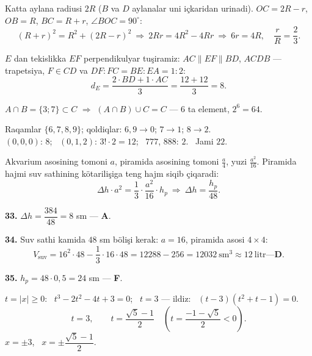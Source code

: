 Katta aylana radiusi $2R$ ($B$ va $D$ aylanalar uni içkaridan urinadi). $OC=2R-r$, $OB=R$, $BC=R+r$, $\angle BOC=90^\circ$:
\[(R+r)^2=R^2+(2R-r)^2\ \Rightarrow\ 2Rr=4R^2-4Rr\ \Rightarrow\ 6r=4R,\quad \frac rR=\frac23.\]

$E$ dan tekislikka $EF$ perpendikulyar tuşiramiz: $AC\parallel EF\parallel BD$, $ACDB$ — trapetsiya, $F\in CD$ va $DF:FC=BE:EA=1:2$:
\[d_E=\frac{2\cdot BD+1\cdot AC}3=\frac{12+12}3=8.\]

$A\cap B=\{3;7\}\subset C$ $\Rightarrow$ $(A\cap B)\cup C=C$ — $6$ ta element, $2^6=64$.

Raqamlar $\{6,7,8,9\}$; qoldiqlar: $6,9\to0$; $7\to1$; $8\to2$.\\
$(0,0,0)$: $8$; \ $(0,1,2)$: $3!\cdot2=12$; \ $777$, $888$: $2$. \ Jami $22$.

\newpage
{}
Akvarium asosining tomoni $a$, piramida asosining tomoni $\frac a4$, yuzi $\frac{a^2}{16}$. Piramida hajmi suv sathining kötarilişiga teng hajm siqib çiqaradi:
\[\Delta h\cdot a^2=\frac13\cdot\frac{a^2}{16}\cdot h_p\ \Rightarrow\ \Delta h=\frac{h_p}{48}.\]

\textbf{33.} $\Delta h=\dfrac{384}{48}=8$ sm — \textbf{A}.

\textbf{34.} Suv sathi kamida $48$ sm bölişi kerak: $a=16$, piramida asosi $4\times4$:
\[V_{\text{suv}}=16^2\cdot48-\frac13\cdot16\cdot48=12288-256=12032\ \text{sm}^3\approx12\ \text{litr} — \textbf{D}.\]

\textbf{35.} $h_p=48\cdot0{,}5=24$ sm — \textbf{F}.

\newpage
{}
$t=|x|\ge0$: \ $t^3-2t^2-4t+3=0$; \ $t=3$ — ildiz: \ $(t-3)\left(t^2+t-1\right)=0$.
\[t=3,\qquad t=\frac{\sqrt5-1}2\quad\left(t=\frac{-1-\sqrt5}2<0\right).\]
$x=\pm3$, \ $x=\pm\dfrac{\sqrt5-1}2$.

